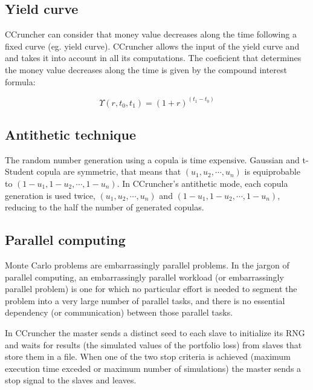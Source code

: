 \documentclass[a4paper,12pt,final]{article}
\begin{document}
\subsection{Yield curve}
CCruncher can consider that money value decreases along the time following a fixed 
curve (eg. yield curve). CCruncher allows the input of the yield curve and and takes
it into account in all its computations. The coeficient that determines the money 
value decreases along the time is given by the compound interest formula:

\begin{displaymath}
\Upsilon(r, t_0,t_1) = (1+r)^{(t_1-t_0)}
\end{displaymath}

\subsection{Antithetic technique}
The random number generation using a copula is time expensive. Gaussian and 
t-Student copula are symmetric, that means that $(u_1, u_2, \cdots, u_n)$ is 
equiprobable to $(1-u_1, 1-u_2, \cdots, 1-u_n)$. In CCruncher's antithetic mode, 
each copula generation is used twice, $(u_1, u_2, \cdots, u_n)$ and 
$(1-u_1, 1-u_2, \cdots, 1-u_n)$, reducing to the half the number of generated
copulas.

\subsection{Parallel computing}
Monte Carlo problems are embarrassingly parallel problems.
In the jargon of parallel computing, an embarrassingly parallel workload 
(or embarrassingly parallel problem) is one for which no particular effort 
is needed to segment the problem into a very large number of parallel tasks, 
and there is no essential dependency (or communication) between those parallel 
tasks.
\newline

In CCruncher the master sends a distinct seed to each slave to initialize its RNG 
and waits for results (the simulated values of the portfolio loss) from slaves that 
store them in a file. When one of the two stop criteria is achieved (maximum execution 
time exceded or maximum number of simulations) the master sends a stop signal to the 
slaves and leaves.
\end{document}
